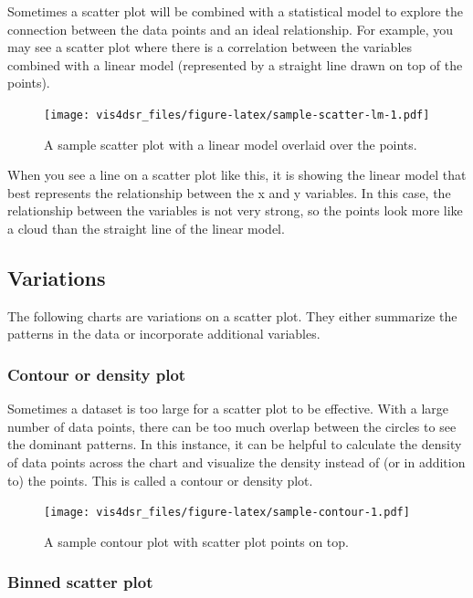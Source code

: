 \documentclass[
]{krantz}
\begin{document}
Sometimes a scatter plot will be combined with a statistical model to explore
the connection between the data points and an ideal relationship. For example, you
may see a scatter plot where there is a correlation between the variables
combined with a linear model (represented by a straight line drawn on top of the points).

\begin{figure}
\centering
\texttt{[image: vis4dsr\_files/figure-latex/sample-scatter-lm-1.pdf]}
\caption{\label{fig:sample-scatter-lm}A sample scatter plot with a linear model overlaid over the points.}
\end{figure}

When you see a line on a scatter plot like this, it is showing the linear model
that best represents the relationship between the x and y variables. In this case,
the relationship between the variables is not very strong, so the points look more
like a cloud than the straight line of the linear model.

\hypertarget{variations-1}{%
\subsection{Variations}\label{variations-1}}

The following charts are variations on a scatter plot. They either summarize the
patterns in the data or incorporate additional variables.

\hypertarget{contour-or-density-plot}{%
\subsubsection{Contour or density plot}\label{contour-or-density-plot}}

Sometimes a dataset is too large for a scatter plot to be effective. With a large
number of data points, there can be too much overlap between the circles to see
the dominant patterns. In this instance, it can be helpful to calculate the density
of data points across the chart and visualize the density instead of (or in addition to)
the points. This is called a contour or density plot.

\begin{figure}
\centering
\texttt{[image: vis4dsr\_files/figure-latex/sample-contour-1.pdf]}
\caption{\label{fig:sample-contour}A sample contour plot with scatter plot points on top.}
\end{figure}

\hypertarget{binned-scatter-plot}{%
\subsubsection{Binned scatter plot}\label{binned-scatter-plot}}
\end{document}
